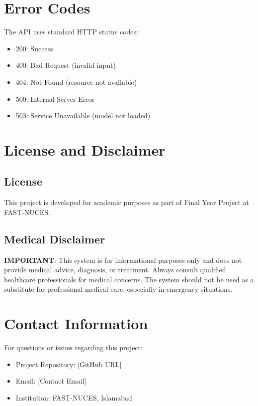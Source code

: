 \section{Error Codes}
The API uses standard HTTP status codes:
\begin{itemize}
    \item 200: Success
    \item 400: Bad Request (invalid input)
    \item 404: Not Found (resource not available)
    \item 500: Internal Server Error
    \item 503: Service Unavailable (model not loaded)
\end{itemize}

\section{License and Disclaimer}
\subsection{License}
This project is developed for academic purposes as part of Final Year Project at FAST-NUCES.

\subsection{Medical Disclaimer}
\textbf{IMPORTANT}: This system is for informational purposes only and does not provide medical advice, diagnosis, or treatment. Always consult qualified healthcare professionals for medical concerns. The system should not be used as a substitute for professional medical care, especially in emergency situations.

\section{Contact Information}
For questions or issues regarding this project:
\begin{itemize}
    \item Project Repository: [GitHub URL]
    \item Email: [Contact Email]
    \item Institution: FAST-NUCES, Islamabad
\end{itemize}
